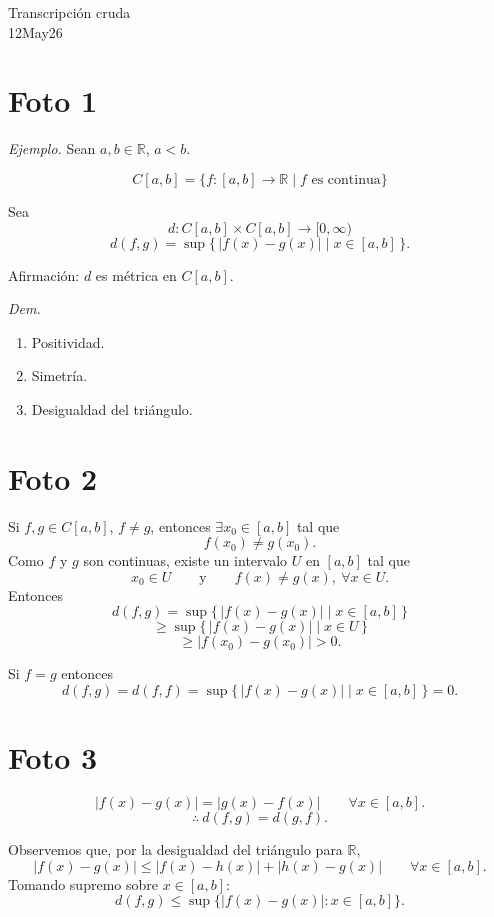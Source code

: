 \documentclass[12pt]{article}
\begin{document}
\begin{center}
{\Large Transcripción cruda}\\[2mm]
{\large 12May26}
\end{center}

\section*{Foto 1}

\textit{Ejemplo.} Sean $a,b\in\mathbb R$, $a<b$.

\[
C[a,b]=\{f:[a,b]\to\mathbb R \mid f \text{ es continua}\}
\]

Sea
\[
d:C[a,b]\times C[a,b]\to [0,\infty)
\]
\[
d(f,g)=\sup\{\,|f(x)-g(x)| \mid x\in[a,b]\,\}.
\]

Afirmación: $d$ es métrica en $C[a,b]$.

\textit{Dem.}
\begin{enumerate}[label=\arabic*)]
    \item Positividad.
    \item Simetría.
    \item Desigualdad del triángulo.
\end{enumerate}

\section*{Foto 2}

Si $f,g\in C[a,b]$, $f\neq g$, entonces $\exists x_0\in[a,b]$ tal que
\[
f(x_0)\neq g(x_0).
\]
Como $f$ y $g$ son continuas, existe un intervalo $U$ en $[a,b]$ tal que
\[
x_0\in U
\qquad \text{y}\qquad
f(x)\neq g(x),\ \forall x\in U.
\]
Entonces
\[
d(f,g)=\sup\{\,|f(x)-g(x)|\mid x\in[a,b]\,\}
\]
\[
\ge \sup\{\,|f(x)-g(x)|\mid x\in U\,\}
\]
\[
\ge |f(x_0)-g(x_0)|>0.
\]

Si $f=g$ entonces
\[
d(f,g)=d(f,f)=\sup\{\,|f(x)-g(x)|\mid x\in[a,b]\,\}=0.
\]

\section*{Foto 3}

\[
|f(x)-g(x)|=|g(x)-f(x)|\qquad \forall x\in[a,b].
\]
\[
\therefore\ d(f,g)=d(g,f).
\]

Observemos que, por la desigualdad del triángulo para $\mathbb R$,
\[
|f(x)-g(x)|\le |f(x)-h(x)|+|h(x)-g(x)|
\qquad \forall x\in[a,b].
\]
Tomando supremo sobre $x\in[a,b]$:
\[
d(f,g)\le \sup\{|f(x)-g(x)|:x\in[a,b]\}.
\]
\end{document}
